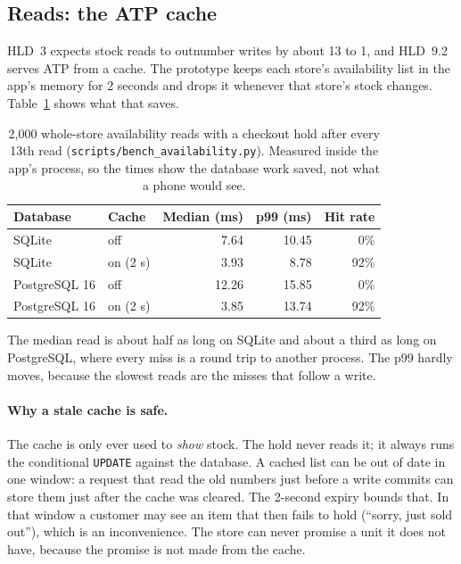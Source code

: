 \subsection{Reads: the ATP cache}

HLD~3 expects stock reads to outnumber writes by about 13 to 1, and HLD~9.2 serves ATP from a cache. The prototype
keeps each store's availability list in the app's memory for 2 seconds and drops it whenever that store's stock
changes. Table~\ref{tab:m1-cache} shows what that saves.

\begin{table}[ht]
  \centering
  \footnotesize
  \begin{tabular}{@{}llrrr@{}}
    \toprule
    Database & Cache & Median (ms) & p99 (ms) & Hit rate \\
    \midrule
    SQLite & off & 7.64 & 10.45 & 0\% \\
    SQLite & on (2 s) & 3.93 & 8.78 & 92\% \\
    \addlinespace[3pt]
    PostgreSQL 16 & off & 12.26 & 15.85 & 0\% \\
    PostgreSQL 16 & on (2 s) & 3.85 & 13.74 & 92\% \\
    \bottomrule
  \end{tabular}
  \caption{2,000 whole-store availability reads with a checkout hold after every 13th read
    (\texttt{scripts/bench\_availability.py}). Measured inside the app's process, so the times show the database work
    saved, not what a phone would see.}
  \label{tab:m1-cache}
\end{table}

The median read is about half as long on SQLite and about a third as long on PostgreSQL, where every miss is a
round trip to another process. The p99 hardly moves, because the slowest reads are the misses that follow a
write.

\paragraph{Why a stale cache is safe.} The cache is only ever used to \emph{show} stock. The hold never reads it;
it always runs the conditional \texttt{UPDATE} against the database. A cached list can be out of date in one
window: a request that read the old numbers just before a write commits can store them just after the cache was
cleared. The 2-second expiry bounds that. In that window a customer may see an item that then fails to hold
(``sorry, just sold out''), which is an inconvenience. The store can never promise a unit it does not have, because
the promise is not made from the cache.

